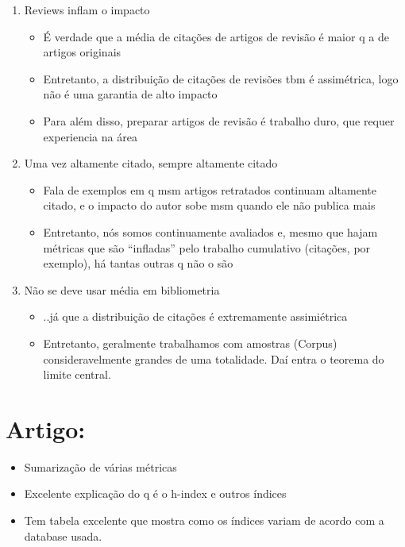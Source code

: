 \documentclass[11pt]{article}
\begin{document}
\begin{itemize}
\begin{enumerate}
\item Reviews inflam o impacto
\begin{itemize}
\item É verdade que a média de citações de artigos de revisão é maior q a de artigos originais
\item Entretanto, a distribuição de citações de revisões tbm é assimétrica, logo não é uma garantia de alto impacto
\item Para além disso, preparar artigos de revisão é trabalho duro, que requer experiencia na área
\end{itemize}
\item Uma vez altamente citado, sempre altamente citado
\begin{itemize}
\item Fala de exemplos em q msm artigos retratados continuam altamente citado, e o impacto do autor sobe msm quando ele não publica mais
\item Entretanto, nós somos continuamente avaliados e, mesmo que hajam métricas que são ``infladas'' pelo trabalho cumulativo (citações, por exemplo), há tantas outras q não o são
\end{itemize}
\item Não se deve usar média em bibliometria
\begin{itemize}
\item ..já que a distribuição de citações é extremamente assimiétrica
\item Entretanto, geralmente trabalhamos com amostras (Corpus) consideravelmente grandes de uma totalidade. Daí entra o teorema do limite central.
\end{itemize}
\end{enumerate}
\end{itemize}

\section{Artigo: \cite{garner2018}}
\label{sec:org5fdd91a}
\begin{itemize}
\item Sumarização de várias métricas
\item Excelente explicação do q é o h-index e outros índices
\item Tem tabela excelente que mostra como os índices variam de acordo com a database usada.
\end{itemize}
\end{document}
